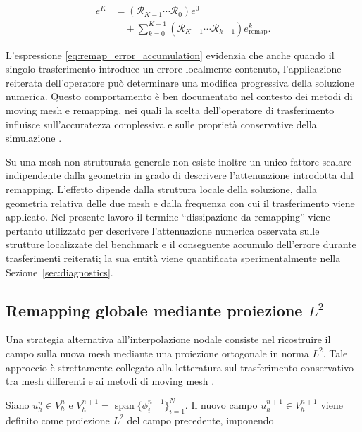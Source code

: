 \begin{equation}
\begin{aligned}
e^{K}
&=
\left(
\mathcal{R}_{K-1}\cdots\mathcal{R}_{0}
\right)e^0
\\
&\quad+
\sum_{k=0}^{K-1}
\left(
\mathcal{R}_{K-1}\cdots\mathcal{R}_{k+1}
\right)
e_{\mathrm{remap}}^k.
\end{aligned}
\label{eq:remap_error_accumulation}
\end{equation}

L'espressione \eqref{eq:remap_error_accumulation} evidenzia che anche quando il singolo trasferimento introduce un errore localmente contenuto, l'applicazione reiterata dell'operatore può determinare una modifica progressiva della soluzione numerica. Questo comportamento è ben documentato nel contesto dei metodi di moving mesh e remapping, nei quali la scelta dell'operatore di trasferimento influisce sull'accuratezza complessiva e sulle proprietà conservative della simulazione \citep{zzhang2006moving,donea2004arbitrary,alauzet2010bpbsup1supconservative}.

Su una mesh non strutturata generale non esiste inoltre un unico fattore scalare indipendente dalla geometria in grado di descrivere l'attenuazione introdotta dal remapping. L'effetto dipende dalla struttura locale della soluzione, dalla geometria relativa delle due mesh e dalla frequenza con cui il trasferimento viene applicato. Nel presente lavoro il termine ``dissipazione da remapping'' viene pertanto utilizzato per descrivere l'attenuazione numerica osservata sulle strutture localizzate del benchmark e il conseguente accumulo dell'errore durante trasferimenti reiterati; la sua entità viene quantificata sperimentalmente nella Sezione~\ref{sec:diagnostics}.

\subsection{Remapping globale mediante proiezione \texorpdfstring{$L^2$}{L2}}
\label{subsec:l2_projection}

Una strategia alternativa all'interpolazione nodale consiste nel ricostruire il campo sulla nuova mesh mediante una proiezione ortogonale in norma $L^2$. Tale approccio è strettamente collegato alla letteratura sul trasferimento conservativo tra mesh differenti e ai metodi di moving mesh \citep{zzhang2006moving,donea2004arbitrary}.

Siano $u_h^n\in V_h^n$ e $V_h^{n+1} = \operatorname{span}\{\phi_i^{n+1}\}_{i=1}^{N}$. Il nuovo campo $u_h^{n+1}\in V_h^{n+1}$ viene definito come proiezione $L^2$ del campo precedente, imponendo

